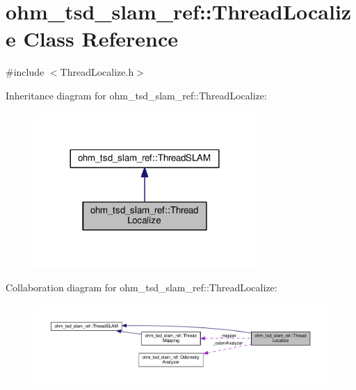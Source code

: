 \hypertarget{classohm__tsd__slam__ref_1_1ThreadLocalize}{\section{ohm\-\_\-tsd\-\_\-slam\-\_\-ref\-:\-:Thread\-Localize Class Reference}
\label{classohm__tsd__slam__ref_1_1ThreadLocalize}
}


{\ttfamily \#include $<$Thread\-Localize.\-h$>$}



Inheritance diagram for ohm\-\_\-tsd\-\_\-slam\-\_\-ref\-:\-:Thread\-Localize\-:\nopagebreak
\begin{figure}[H]
\begin{center}
\leavevmode
\includegraphics[width=240pt]{classohm__tsd__slam__ref_1_1ThreadLocalize__inherit__graph}
\end{center}
\end{figure}


Collaboration diagram for ohm\-\_\-tsd\-\_\-slam\-\_\-ref\-:\-:Thread\-Localize\-:\nopagebreak
\begin{figure}[H]
\begin{center}
\leavevmode
\includegraphics[width=350pt]{classohm__tsd__slam__ref_1_1ThreadLocalize__coll__graph}
\end{center}
\end{figure}
